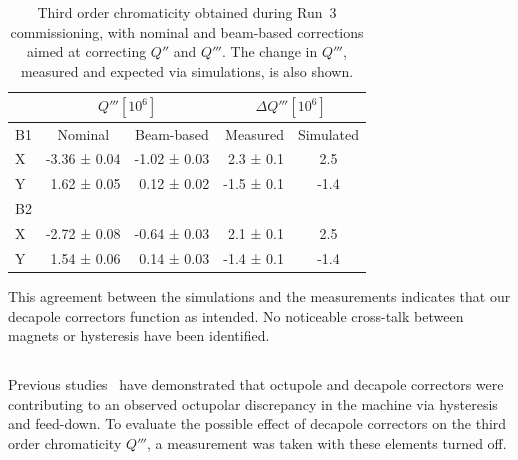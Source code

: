 \begin{table}[H]
    \centering
    \begin{tabular}{|l||r|r|r|c|}
    \hline
              &  \multicolumn{2}{c|}{$Q''' [10^6]$}  &  \multicolumn{2}{c|}{$\Delta Q''' [10^6]$}\\ \hline\hline
        B1    &   \multicolumn{1}{c|}{Nominal}     &   \multicolumn{1}{c|}{Beam-based}   & Measured & Simulated \\
        X     &  -3.36 ± 0.04 &  -1.02 ± 0.03  &  2.3 ± 0.1 &   2.5 \\
        Y     &   1.62 ± 0.05 &   0.12 ± 0.02  & -1.5 ± 0.1 &  -1.4 \\ \hline
        B2    &               &&& \\
        X     &  -2.72 ± 0.08 &  -0.64 ± 0.03  &  2.1 ± 0.1 &  2.5\\
        Y     &   1.54 ± 0.06 &   0.14 ± 0.03  & -1.4 ± 0.1 & -1.4\\ \hline
    \end{tabular}
    \caption{Third order chromaticity obtained during Run~3 commissioning, with nominal and
    beam-based corrections aimed at correcting $Q''$ and $Q'''$.
    The change in $Q'''$, measured and expected via simulations, is also shown.} 
    \label{table:decapoles:chromaticity:dq3_before_after_beam_based}
\end{table}


This agreement between the simulations and the measurements indicates that our decapole correctors
function as intended. No noticeable cross-talk between magnets or hysteresis have been identified.


\subsection{}


Previous studies~\cite{maclean_measurement_2014} have demonstrated that octupole and decapole
correctors were contributing to an observed octupolar discrepancy in the machine via hysteresis and
feed-down. To evaluate the possible effect of decapole correctors on the third order chromaticity
$Q'''$, a measurement was taken with these elements turned off.

